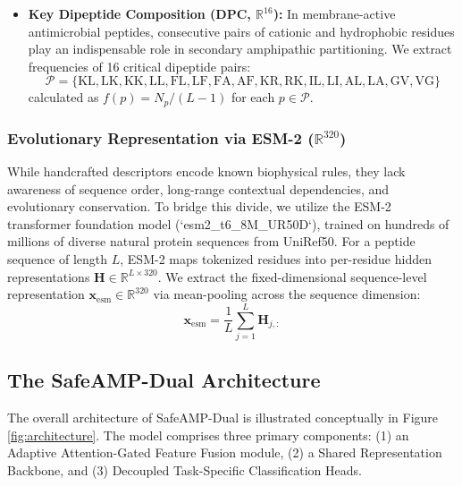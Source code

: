 \documentclass[11pt,a4paper]{article}
\begin{document}
\begin{itemize}
\begin{enumerate}
    \end{enumerate}
    \item \textbf{Key Dipeptide Composition (DPC, $\mathbb{R}^{16}$):} In membrane-active antimicrobial peptides, consecutive pairs of cationic and hydrophobic residues play an indispensable role in secondary amphipathic partitioning. We extract frequencies of 16 critical dipeptide pairs:
    \begin{equation}
        \mathcal{P} = \{\text{KL}, \text{LK}, \text{KK}, \text{LL}, \text{FL}, \text{LF}, \text{FA}, \text{AF}, \text{KR}, \text{RK}, \text{IL}, \text{LI}, \text{AL}, \text{LA}, \text{GV}, \text{VG}\}
    \end{equation}
    calculated as $f(p) = N_p / (L - 1)$ for each $p \in \mathcal{P}$.
\end{itemize}

\subsubsection{Evolutionary Representation via ESM-2 ($\mathbb{R}^{320}$)}
While handcrafted descriptors encode known biophysical rules, they lack awareness of sequence order, long-range contextual dependencies, and evolutionary conservation. To bridge this divide, we utilize the ESM-2 transformer foundation model \cite{lin2023evolutionary} (`esm2\_t6\_8M\_UR50D`), trained on hundreds of millions of diverse natural protein sequences from UniRef50. For a peptide sequence of length $L$, ESM-2 maps tokenized residues into per-residue hidden representations $\mathbf{H} \in \mathbb{R}^{L \times 320}$. We extract the fixed-dimensional sequence-level representation $\mathbf{x}_{\text{esm}} \in \mathbb{R}^{320}$ via mean-pooling across the sequence dimension:
\begin{equation}
    \mathbf{x}_{\text{esm}} = \frac{1}{L} \sum_{j=1}^{L} \mathbf{H}_{j, :}
\end{equation}

\subsection{The SafeAMP-Dual Architecture}
The overall architecture of SafeAMP-Dual is illustrated conceptually in Figure \ref{fig:architecture}. The model comprises three primary components: (1) an Adaptive Attention-Gated Feature Fusion module, (2) a Shared Representation Backbone, and (3) Decoupled Task-Specific Classification Heads.
\end{document}
